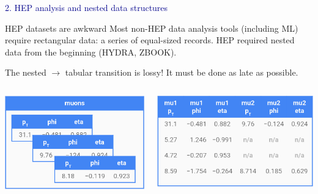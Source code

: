 \documentclass[aspectratio=169]{beamer}
\begin{document}
\begin{frame}{}
\LARGE
\vspace{1 cm}
\begin{center}
\textcolor{darkblue}{2. HEP analysis and nested data structures}
\end{center}
\end{frame}

\begin{frame}{HEP datasets are awkward}
\vspace{0.5 cm}
Most non-HEP data analysis tools (including ML) require rectangular data: a series of equal-sized records. HEP required nested data from the beginning (HYDRA, ZBOOK).

\vspace{0.35 cm}
The nested $\to$ tabular transition is lossy! It must be done as late as possible.

\vspace{0.65 cm}
\begin{columns}
\includegraphics[width=\linewidth]{muons-as-objects.png}

\includegraphics[width=\linewidth]{muons-as-a-table.png}
\end{columns}
\end{frame}
\end{document}
